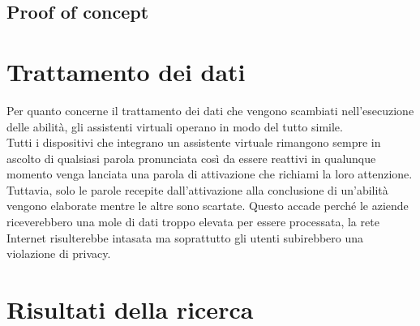 	\subsection{Proof of concept}

\section{Trattamento dei dati}
Per quanto concerne il trattamento dei dati che vengono scambiati nell'esecuzione delle abilità, gli assistenti virtuali operano in modo del tutto simile. \\
Tutti i dispositivi che integrano un assistente virtuale rimangono sempre in ascolto di qualsiasi parola pronunciata così da essere reattivi in qualunque momento venga lanciata una parola di attivazione che richiami la loro attenzione. Tuttavia, solo le parole recepite dall'attivazione alla conclusione di un'abilità vengono elaborate mentre le altre sono scartate. Questo accade perché le aziende riceverebbero una mole di dati troppo elevata per essere processata, la rete Internet risulterebbe intasata ma soprattutto gli utenti subirebbero una violazione di privacy.
\section{Risultati della ricerca}